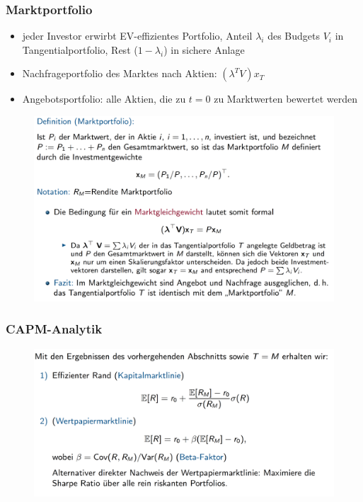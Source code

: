 \documentclass[12pt]{report}
\theoremstyle{dotless}
\theoremstyle{definition}
\begin{document}
\subsubsection{Marktportfolio}
\begin{itemize}
	\item jeder Investor erwirbt EV-effizientes Portfolio, Anteil $\lambda_i$ des Budgets $V_i$ in Tangentialportfolio, Rest ($1-\lambda_i$) in sichere Anlage
	\item Nachfrageportfolio des Marktes nach Aktien: $(\lambda^T V)x_T$
	\item Angebotsportfolio: alle Aktien, die zu $t=0$ zu Marktwerten bewertet werden
\end{itemize}

\begin{figure}[H]
\centering
\includegraphics[width=\textwidth]{Bilder/Marktportfolio.png}
\end{figure}

\subsubsection{CAPM-Analytik}

\begin{figure}[H]
\centering
\includegraphics[width=\textwidth]{Bilder/CAPMAnalytik.png}
\end{figure}
\end{document}
